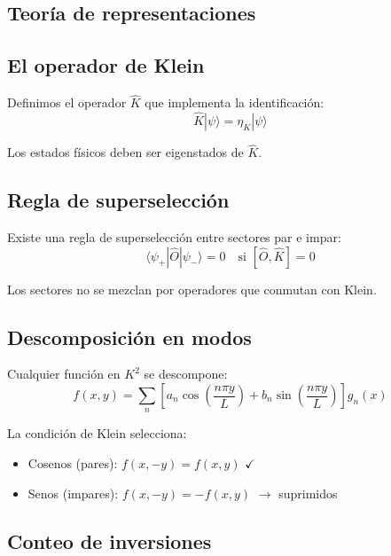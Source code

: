 \documentclass[12pt,a4paper,openany]{book}
\begin{document}
\begin{nivelmatematico}

\section*{Teoría de representaciones}

\subsection*{El operador de Klein}

Definimos el operador $\hat{K}$ que implementa la identificación:
\begin{equation}
    \hat{K} |\psi\rangle = \eta_K |\psi\rangle
\end{equation}

Los estados físicos deben ser eigenstados de $\hat{K}$.

\subsection*{Regla de superselección}

Existe una regla de superselección entre sectores par e impar:
\begin{equation}
    \langle\psi_+|\hat{O}|\psi_-\rangle = 0 \quad \text{si } [\hat{O}, \hat{K}] = 0
\end{equation}

Los sectores no se mezclan por operadores que conmutan con Klein.

\subsection*{Descomposición en modos}

Cualquier función en $K^2$ se descompone:
\begin{equation}
    f(x,y) = \sum_n \left[a_n \cos\left(\frac{n\pi y}{L}\right) + b_n \sin\left(\frac{n\pi y}{L}\right)\right] g_n(x)
\end{equation}

La condición de Klein selecciona:
\begin{itemize}
    \item Cosenos (pares): $f(x, -y) = f(x, y)$ $\checkmark$
    \item Senos (impares): $f(x, -y) = -f(x, y)$ $\to$ suprimidos
\end{itemize}

\subsection*{Conteo de inversiones}


\end{nivelmatematico}
\end{document}
